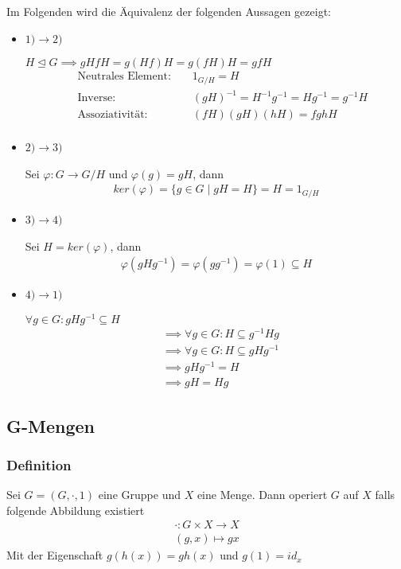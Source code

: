 \documentclass[12pt, german]{article}
\begin{document}
	Im Folgenden wird die Äquivalenz der folgenden Aussagen gezeigt: 
	\begin{itemize}
		\item $1)\rightarrow 2)$ ~\par
			$H\trianglelefteq G \implies gHfH = g(Hf)H = g(fH)H = gfH$
			\begin{align*}
				&\text{ Neutrales Element: } &&1_{G/H} = H \\
				&\text{ Inverse: } &&(gH)^{-1} = H^{-1}g^{-1}= Hg^{-1}=g^{-1}H \\
				&\text{ Assoziativität: } &&(fH)(gH)(hH)= fghH\\
			\end{align*}
			
		\item $2)\rightarrow 3)$ ~\par
		Sei $\varphi : G \to G/H $ und $\varphi(g) = gH$, dann
			\begin{align*}
				ker(\varphi) = \{g \in G \mid gH = H\} = H = 1_{G/H}
			\end{align*}
		
		\item $3)\rightarrow 4)$~\par
		Sei $H = ker(\varphi)$, dann
			\begin{align*}
				\varphi(gHg^{-1}) = \varphi(gg^{-1}) = \varphi(1) \subseteq H 
			\end{align*}
		
		\item $4)\rightarrow 1)$~\par
		$\forall g \in G : gHg^{-1} \subseteq H$
			\begin{align*}
			&\implies  \forall g \in G : H \subseteq g^{-1}Hg \\
			&\implies \forall g \in G : H \subseteq gHg^{-1} \\
			&\implies gHg^{-1} = H \\
			&\implies gH = Hg
			\end{align*}
	\end{itemize}



\subsection{G-Mengen}		
\subsubsection{Definition}
	Sei $G = (G, \cdot, 1)$ eine Gruppe und $X$ eine Menge.
	Dann operiert $G$ auf $X$ falls folgende Abbildung existiert 
	\begin{align*}
		\cdot : G \times X \to X \\ 
		(g,x) \mapsto gx
	\end{align*}
	Mit der Eigenschaft $g(h(x)) = gh(x)$ und $g(1) = id_x$
\end{document}
